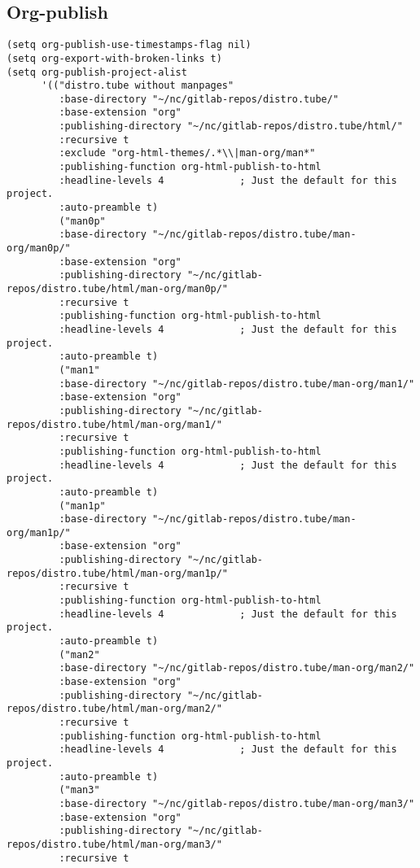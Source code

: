 \documentclass[11pt]{article}
\begin{document}
\subsection{Org-publish}
\label{sec:org265791a}
\begin{verbatim}
(setq org-publish-use-timestamps-flag nil)
(setq org-export-with-broken-links t)
(setq org-publish-project-alist
      '(("distro.tube without manpages"
         :base-directory "~/nc/gitlab-repos/distro.tube/"
         :base-extension "org"
         :publishing-directory "~/nc/gitlab-repos/distro.tube/html/"
         :recursive t
         :exclude "org-html-themes/.*\\|man-org/man*"
         :publishing-function org-html-publish-to-html
         :headline-levels 4             ; Just the default for this project.
         :auto-preamble t)
         ("man0p"
         :base-directory "~/nc/gitlab-repos/distro.tube/man-org/man0p/"
         :base-extension "org"
         :publishing-directory "~/nc/gitlab-repos/distro.tube/html/man-org/man0p/"
         :recursive t
         :publishing-function org-html-publish-to-html
         :headline-levels 4             ; Just the default for this project.
         :auto-preamble t)
         ("man1"
         :base-directory "~/nc/gitlab-repos/distro.tube/man-org/man1/"
         :base-extension "org"
         :publishing-directory "~/nc/gitlab-repos/distro.tube/html/man-org/man1/"
         :recursive t
         :publishing-function org-html-publish-to-html
         :headline-levels 4             ; Just the default for this project.
         :auto-preamble t)
         ("man1p"
         :base-directory "~/nc/gitlab-repos/distro.tube/man-org/man1p/"
         :base-extension "org"
         :publishing-directory "~/nc/gitlab-repos/distro.tube/html/man-org/man1p/"
         :recursive t
         :publishing-function org-html-publish-to-html
         :headline-levels 4             ; Just the default for this project.
         :auto-preamble t)
         ("man2"
         :base-directory "~/nc/gitlab-repos/distro.tube/man-org/man2/"
         :base-extension "org"
         :publishing-directory "~/nc/gitlab-repos/distro.tube/html/man-org/man2/"
         :recursive t
         :publishing-function org-html-publish-to-html
         :headline-levels 4             ; Just the default for this project.
         :auto-preamble t)
         ("man3"
         :base-directory "~/nc/gitlab-repos/distro.tube/man-org/man3/"
         :base-extension "org"
         :publishing-directory "~/nc/gitlab-repos/distro.tube/html/man-org/man3/"
         :recursive t

\end{verbatim}
\end{document}
